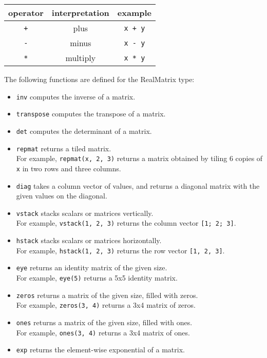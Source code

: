 \begin{table}[H]
\centering
\begin{tabular}{ c c c }
\toprule 
operator & interpretation & example \\
\midrule
\verb|+| & plus & \verb|x + y| \\ 
\verb|-| & minus & \verb|x - y| \\ 
\verb|*| & multiply & \verb|x * y| \\
\bottomrule
\end{tabular}
\end{table}

The following functions are defined for the RealMatrix type:

\begin{itemize}
\item
    \verb|inv| computes the inverse of a matrix.
\item
    \verb|transpose| computes the transpose of a matrix.
\item
    \verb|det| computes the determinant of a matrix.
\item
    \verb|repmat| returns a tiled matrix. \\
    For example, \verb|repmat(x, 2, 3)| returns a matrix obtained by tiling 6
    copies of \verb|x| in two rows and three columns.
\item
    \verb|diag| takes a column vector of values, and returns a diagonal matrix
    with the given values on the diagonal.
\item
    \verb|vstack| stacks scalars or matrices vertically. \\
    For example, \verb|vstack(1, 2, 3)| returns the column vector {\tt [1; 2;
    3]}.
\item
    \verb|hstack| stacks scalars or matrices horizontally. \\
    For example, \verb|hstack(1, 2, 3)| returns the row vector {\tt [1, 2, 3]}.
\item
    \verb|eye| returns an identity matrix of the given size. \\
    For example, \verb|eye(5)| returns a 5x5 identity matrix.
\item
    \verb|zeros| returns a matrix of the given size, filled with zeros. \\
    For example, \verb|zeros(3, 4)| returns a 3x4 matrix of zeros.
\item
    \verb|ones| returns a matrix of the given size, filled with ones. \\
    For example, \verb|ones(3, 4)| returns a 3x4 matrix of ones.
\item
    \verb|exp| returns the element-wise exponential of a matrix. \\
\end{itemize}


